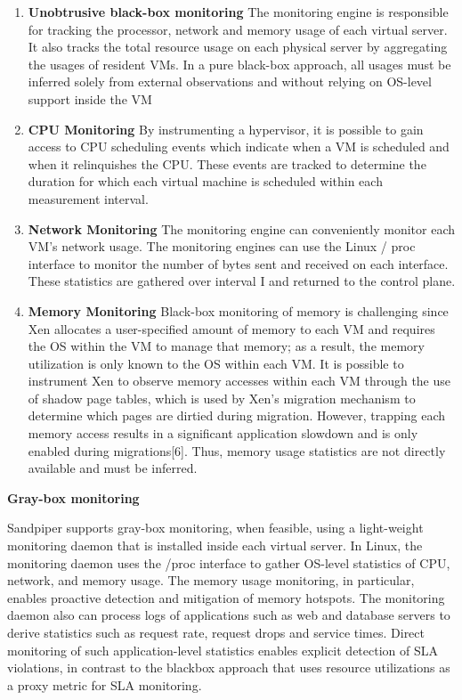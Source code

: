 \documentclass[12pt]{article} %
\begin{document}
\begin{enumerate}
\item{\textbf{Unobtrusive black-box monitoring}} The monitoring engine is responsible for tracking the processor, network and memory usage of each virtual server.
It also tracks the total resource usage on each physical
server by aggregating the usages of resident VMs.
In a pure black-box approach, all usages must be inferred
solely from external observations and without relying
on OS-level support inside the VM

\item{\textbf{CPU Monitoring}} By instrumenting a hypervisor,
it is possible to gain access to CPU
scheduling events which indicate when a VM is scheduled
and when it relinquishes the CPU. These events are tracked
to determine the duration for which each virtual machine
is scheduled within each measurement interval.

\item{\textbf{Network Monitoring}} The monitoring engine can conveniently
monitor each VM’s network usage. The monitoring engines can use the Linux /
proc interface to monitor the number of bytes sent and received on each interface.
These statistics are gathered over interval I and returned
to the control plane.

\item{\textbf{Memory Monitoring}} Black-box monitoring of memory
is challenging since Xen allocates a user-specified amount
of memory to each VM and requires the OS within the VM
to manage that memory; as a result, the memory utilization
is only known to the OS within each VM. It is possible
to instrument Xen to observe memory accesses within
each VM through the use of shadow page tables, which is
used by Xen’s migration mechanism to determine which
pages are dirtied during migration. However, trapping each
memory access results in a significant application slowdown
and is only enabled during migrations[6]. Thus,
memory usage statistics are not directly available and
must be inferred.


\end{enumerate}


\textbf{Gray-box monitoring}




Sandpiper supports gray-box monitoring, when feasible,
using a light-weight monitoring daemon that is installed
inside each virtual server. In Linux, the monitoring daemon uses the /proc interface to gather OS-level statistics of CPU, network, and memory usage.
The memory usage monitoring, in particular, enables proactive
detection and mitigation of memory hotspots. The
monitoring daemon also can process logs of applications
such as web and database servers to derive statistics such
as request rate, request drops and service times. Direct
monitoring of such application-level statistics enables explicit
detection of SLA violations, in contrast to the blackbox
approach that uses resource utilizations as a proxy
metric for SLA monitoring.
\end{document}
